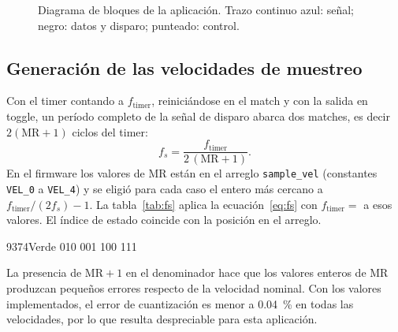 \documentclass[11pt,a4paper]{article}
\begin{document}
\begin{figure}[H]
\caption{Diagrama de bloques de la aplicación. Trazo continuo azul: señal;
negro: datos y disparo; punteado: control.}
\label{fig:bloques}
\end{figure}

\subsection{Generación de las velocidades de muestreo}

Con el timer contando a $f_{\text{timer}}$, reiniciándose en el match y con
la salida en toggle, un período completo de la señal de disparo abarca dos
matches, es decir $2(\text{MR}+1)$ ciclos del timer:
\begin{equation}
  f_s = \frac{f_{\text{timer}}}{2\,(\text{MR} + 1)}.
  \label{eq:fs}
\end{equation}
En el firmware los valores de MR están en el arreglo \texttt{sample\_vel}
(constantes \texttt{VEL\_0} a \texttt{VEL\_4}) y se eligió para cada caso el
entero más cercano a $f_{\text{timer}}/(2 f_s)-1$. La
tabla~\ref{tab:fs} aplica la ecuación~\eqref{eq:fs} con
$f_{\text{timer}} = $ \ftimer{} a esos valores. El índice de estado coincide
con la posición en el arreglo.

\begin{table}[H]
\centering
\caption{Velocidades de muestreo, valor de match programado y color del LED.}
\label{tab:fs}
\begin{tablamuestreo}
   {9374}{Verde}   {0}{1}{0}
      {0}{0}{1}
      {1}{0}{0}
    {1}{1}{1}
\end{tablamuestreo}
\end{table}

La presencia de $\text{MR}+1$ en el denominador hace que los valores enteros
de MR produzcan pequeños errores respecto de la velocidad nominal. Con los
valores implementados, el error de cuantización es menor a \qty{0.04}{\percent}
en todas las velocidades, por lo que resulta despreciable para esta aplicación.
\end{document}
